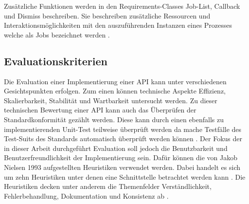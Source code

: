 Zusätzliche Funktionen werden in den Requirements-Classes Job-List, Callback und Dismiss beschreiben. Sie beschreiben zusätzliche Ressourcen und Interaktionsmöglichkeiten 
mit den auszuführenden Instanzen eines Prozesses welche als Jobs bezeichnet werden \cite{ogc_api_processes_core}.

\subsection{Evaluationskriterien}
Die Evaluation einer Implementierung einer API kann unter verschiedenen Gesichtspunkten erfolgen. Zum einen können technische Aspekte Effizienz, Skalierbarkeit,
Stabilität und Wartbarkeit untersucht werden. Zu dieser technischen Bewertung einer API kann auch das Überprüfen der Standardkonformität gezählt werden. 
Diese kann durch einen ebenfalls zu implementierenden Unit-Test teilweise überprüft werden da mache Testfälle des Test-Suits des Standards automatisch überprüft
werden können \cite{ogc_api_processes_core}. Der Fokus der in dieser Arbeit durchgeführt Evaluation soll jedoch die Benutzbarkeit und Benutzerfreundlichkeit der 
Implementierung sein. Dafür können die von Jakob Nielsen 1993 aufgestellten Heuristiken verwendet werden. Dabei handelt es sich um zehn Heuristiken unter denen 
eine Schnittstelle betrachtet werden kann \cite{usability_engineering}. Die Heuristiken decken unter anderem die Themenfelder Verständlichkeit, Fehlerbehandlung, 
Dokumentation und Konsistenz ab \cite{usability_engineering}. 




